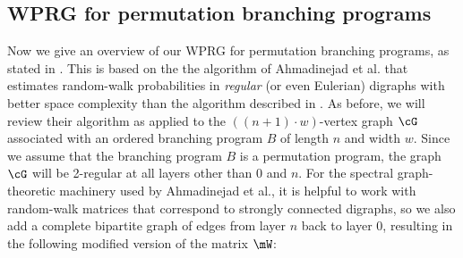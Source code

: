 \documentclass{toc}
\begin{document}
    \subsection{WPRG for permutation branching programs}\label{subsec:PBP_proof_overview}
    Now we give an overview of our WPRG for permutation branching programs, as stated in . This is based on the
    the algorithm of 
%
Ahmadinejad  %
et al. that estimates random-walk probabilities in \emph{regular} (or even Eulerian) digraphs with better space complexity than the algorithm described in .  As before, we will review their algorithm as applied to the $((n+1)\cdot w)$-vertex graph $\cG$ associated with an ordered branching program $B$ of length $n$ and width $w$.  Since we assume that the branching program $B$ is a permutation program, the graph $\cG$ will be 2-regular at all layers other than $0$ and $n$.  For the spectral graph-theoretic machinery used by 
%
Ahmadinejad  %
et al., it is helpful to work with random-walk matrices that correspond to strongly connected digraphs, so we also add a complete bipartite graph of edges from layer $n$ back to layer $0$, resulting in the following modified version of the matrix $\mW$:
    
\end{document}
